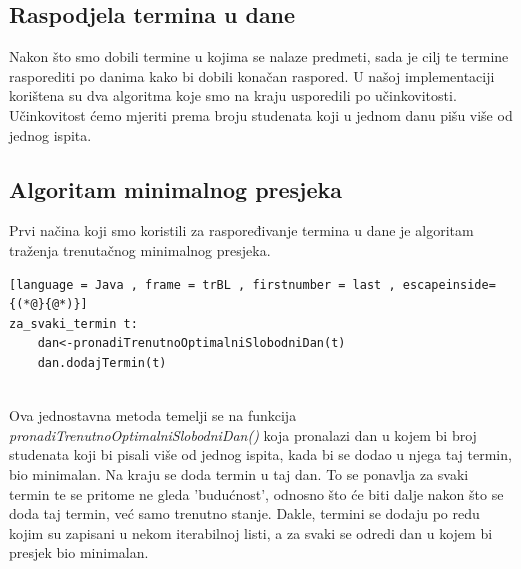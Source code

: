 \documentclass[times, utf8, zavrsni, numeric]{fer}
\begin{document}
\subsection*{Raspodjela termina u dane}
\label{sec:raspodjelaTermina}
\par Nakon što smo dobili termine u kojima se nalaze predmeti, sada je cilj te termine rasporediti po danima kako bi dobili konačan raspored. U našoj implementaciji korištena su dva algoritma koje smo na kraju usporedili po učinkovitosti. Učinkovitost ćemo mjeriti prema broju studenata koji u jednom danu pišu više od jednog ispita.\par

\subsection*{Algoritam minimalnog presjeka}
Prvi načina koji smo koristili za raspoređivanje termina u dane je algoritam traženja trenutačnog minimalnog presjeka.
\medskip
\begin{lstlisting}[language = Java , frame = trBL , firstnumber = last , escapeinside={(*@}{@*)}]
za_svaki_termin t:
	dan<-pronadiTrenutnoOptimalniSlobodniDan(t)
	dan.dodajTermin(t)
	
\end{lstlisting}
\medskip
Ova jednostavna metoda temelji se na funkcija \textit{pronadiTrenutnoOptimalniSlobodniDan()} koja pronalazi dan u kojem bi broj studenata koji bi pisali više od jednog ispita, kada bi se dodao u njega taj termin, bio minimalan. Na kraju se doda termin u taj dan. To se ponavlja za svaki termin te se pritome ne gleda 'budućnost', odnosno što će biti dalje nakon što se doda taj termin, već samo trenutno stanje. Dakle, termini se dodaju po redu kojim su zapisani u nekom iterabilnoj listi, a za svaki se odredi dan u kojem bi presjek bio minimalan. 
\end{document}
